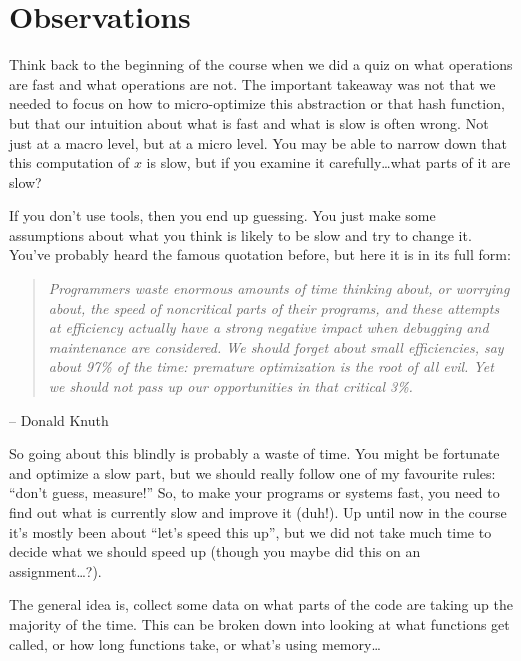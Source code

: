 




\section*{Observations}

Think back to the beginning of the course when we did a quiz on what operations are fast and what operations are not. The important takeaway was not that we needed to focus on how to micro-optimize this abstraction or that hash function, but that our intuition about what is fast and what is slow is often wrong. Not just at a macro level, but at a micro level. You may be able to narrow down that this computation of $x$ is slow, but if you examine it carefully\ldots what parts of it are slow?

If you don't use tools, then you end up guessing. You just make some assumptions about what you think is likely to be slow and try to change it. You've probably heard the famous quotation before, but here it is in its full form:

\begin{quote}
\textit{Programmers waste enormous amounts of time thinking about, or worrying about, the speed of noncritical parts of their programs, and these attempts at efficiency actually have a strong negative impact when debugging and maintenance are considered. We should forget about small efficiencies, say about 97\% of the time: premature optimization is the root of all evil. Yet we should not pass up our opportunities in that critical 3\%.}
\end{quote}
	\hfill -- Donald Knuth

So going about this blindly is probably a waste of time. You might be fortunate and optimize a slow part, but we should really follow one of my favourite rules: ``don't guess, measure!'' So, to make your programs or systems fast, you need to find out what is currently slow and improve it (duh!). Up until now in the course it's mostly been about ``let's speed this up'', but we did not take much time to decide what we should speed up (though you maybe did this on an assignment\ldots?).

The general idea is, collect some data on what parts of the code are taking up the majority of the time. This can be broken down into looking at what functions get called, or how long functions take, or what's using memory\ldots

